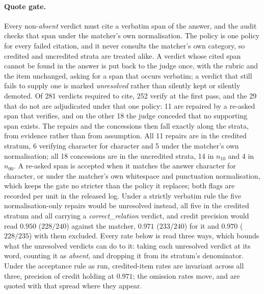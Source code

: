 \documentclass[10pt,twocolumn]{article}
\begin{document}
\paragraph{Quote gate.} Every non-\emph{absent} verdict must cite a verbatim span of the answer, and the audit checks that span under the matcher's own normalisation. The policy is one policy for every failed citation, and it never consults the matcher's own category, so credited and uncredited strata are treated alike. A verdict whose cited span cannot be found in the answer is put back to the judge once, with the rubric and the item unchanged, asking for a span that occurs verbatim; a verdict that still fails to supply one is marked \emph{unresolved} rather than silently kept or silently demoted. Of 281 verdicts required to cite, 252 verify at the first pass, and the 29 that do not are adjudicated under that one policy: 11 are repaired by a re-asked span that verifies, and on the other 18 the judge conceded that no supporting span exists. The repairs and the concessions then fall exactly along the strata, from evidence rather than from assumption. All 11 repairs are in the credited stratum, 6 verifying character for character and 5 under the matcher's own normalisation; all 18 concessions are in the uncredited strata, 14 in $n_{10}$ and 4 in $n_{00}$. A re-asked span is accepted when it matches the answer character for character, or under the matcher's own whitespace and punctuation normalisation, which keeps the gate no stricter than the policy it replaces; both flags are recorded per unit in the released log. Under a strictly verbatim rule the five normalisation-only repairs would be unresolved instead, all five in the credited stratum and all carrying a \emph{correct\_relation} verdict, and credit precision would read $0.950$ ($228/240$) against the matcher, $0.971$ ($233/240$) for it and $0.970$ ($228/235$) with them excluded. Every rate below is read three ways, which bounds what the unresolved verdicts can do to it: taking each unresolved verdict at its word, counting it as \emph{absent}, and dropping it from its stratum's denominator. Under the acceptance rule as run, credited-item rates are invariant across all three, precision of credit holding at $0.971$; the omission rates move, and are quoted with that spread where they appear.
\end{document}
